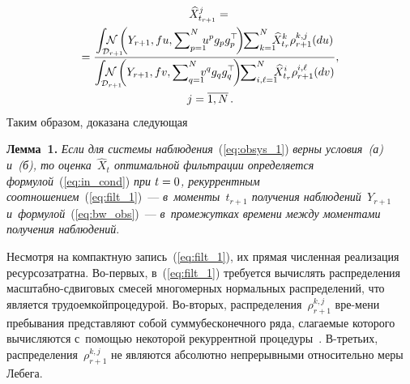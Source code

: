 \begin{multicols}{2}
 \begin{multline}
 \widehat{X}_{t_{r+1}}^j = {}\\
 \hspace*{-1mm}{}=
 \fr{\int\nolimits_{\mathcal{D}_{r+1}}\hspace*{-6mm} 
 \mathcal{N}\left(Y_{r+1},f u,\sum\nolimits_{p=1}^N \hspace*{-2mm}
 u^p g_pg_p^{\top}\!\right)\hspace*{-1mm}
 \sum\nolimits_{k=1}^N \hspace*{-2mm}
 \widehat{X}_{t_r}^k
 \rho^{k,j}_{r+1}(du)
 }
 { \int\nolimits_{\mathcal{D}_{r+1}} \hspace*{-6mm}
 \mathcal{N}\left(Y_{r+1},f v,\sum\nolimits_{q=1}^N \hspace*{-2mm}
 v^q g_qg_q^{\top}\!\right)\hspace*{-1mm}
 \sum\nolimits_{i,\ell=1}^N \hspace*{-2mm}
 \widehat{X}_{t_r}^i
 \rho^{i,\ell}_{r+1}(dv)
  },  \\ 
  j = \overline{1,N}\,.
 \label{eq:filt_1}
 \end{multline}
 Таким образом, доказана следующая
 
 
 \noindent
 \textbf{Лемма~1.}
\textit{Если для системы наблюдения}~(\ref{eq:obsys_1}) 
\textit{верны условия~(а) и~(б), то оценка~$\widehat{X}_t$ оптимальной фильтрации 
определяется формулой}~(\ref{eq:in_cond}) 
\textit{при $t\hm=0$, рекуррентным соотношением}~(\ref{eq:filt_1})~---
\textit{в~моменты~$t_{r+1}$ получения наблюдений~$Y_{r+1}$ 
и~формулой}~(\ref{eq:bw_obs})~--- 
\textit{в~промежутках времени между моментами получения наблюдений}.


\smallskip
 

 
 Несмотря на компактную запись~(\ref{eq:filt_1}), их прямая численная реализация 
 ресурсозатратна. Во-пер\-вых, в~(\ref{eq:filt_1}) требуется вычислять 
 распределения мас\-штаб\-но-сдви\-го\-вых смесей многомерных нормальных 
 распределений, что является трудоемкой\linebreak процедурой. Во-вто\-рых, 
 распределения~$\rho^{k,j}_{r+1}$ вре-\linebreak мени пребывания представляют собой 
 сумму\linebreak бесконечного ряда, слагаемые которого вычис\-ляются с~помощью 
 некоторой рекуррентной про\-це\-дуры~\cite{S_00}. В-третьих, 
 распределения~$\rho^{k,j}_{r+1}$ не являются абсолютно непрерывными 
 относительно меры Ле\-бега.
 { %
 
}
\end{multicols}
